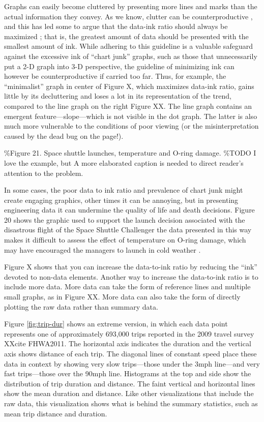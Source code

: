 \documentclass[]{krantz}
\theoremstyle{definition}
\theoremstyle{definition}
\theoremstyle{definition}
\theoremstyle{remark}
\begin{document}
Graphs can easily become cluttered by presenting more lines and marks
than the actual information they convey. As we know, clutter can be
counterproductive , and this has led some to argue that the data-ink
ratio should always be maximized \citep{Tufte1983}; that is, the
greatest amount of data should be presented with the smallest amount of
ink. While adhering to this guideline is a valuable safeguard against
the excessive ink of ``chart junk'' graphs, such as those that
unnecessarily put a 2-D graph into 3-D perspective, the guideline of
minimizing ink can however be counterproductive if carried too far.
Thus, for example, the ``minimalist'' graph in center of Figure X, which
maximizes data-ink ratio, gains little by its decluttering and loses a
lot in its representation of the trend, compared to the line graph on
the right Figure XX. The line graph contains an emergent
feature---slope---which is not visible in the dot graph. The latter is
also much more vulnerable to the conditions of poor viewing (or the
misinterpretation caused by the dead bug on the page!).

\%Figure 21. Space shuttle launches, temperature and O-ring damage.
\%TODO I love the example, but A more elaborated caption is needed to
direct reader's attention to the problem.

In some cases, the poor data to ink ratio and prevalence of chart junk
might create engaging graphics, other times it can be annoying, but in
presenting engineering data it can undermine the quality of life and
death decisions. Figure 20 shows the graphic used to support the launch
decision associated with the disastrous flight of the Space Shuttle
Challenger the data presented in this way makes it difficult to assess
the effect of temperature on O-ring damage, which may have encouraged
the managers to launch in cold weather \citep{Tufte1997}.

Figure X shows that you can increase the data-to-ink ratio by reducing
the ``ink'' devoted to non-data elements. Another way to increase the
data-to-ink ratio is to include more data. More data can take the form
of reference lines and multiple small graphs, as in Figure XX. More data
can also take the form of directly plotting the raw data rather than
summary data.

Figure \ref{fig:trip-dur} shows an extreme version, in which each data
point represents one of approximately 693,000 trips reported in the 2009
travel survey XXcite FHWA2011. The horizontal axis indicates the
duration and the vertical axis shows distance of each trip. The diagonal
lines of constant speed place these data in context by showing very slow
trips---those under the 3mph line---and very fast trips---those over the
90mph line. Histograms at the top and side show the distribution of trip
duration and distance. The faint vertical and horizontal lines show the
mean duration and distance. Like other visualizations that include the
raw data, this visualization shows what is behind the summary
statistics, such as mean trip distance and duration.
\end{document}

